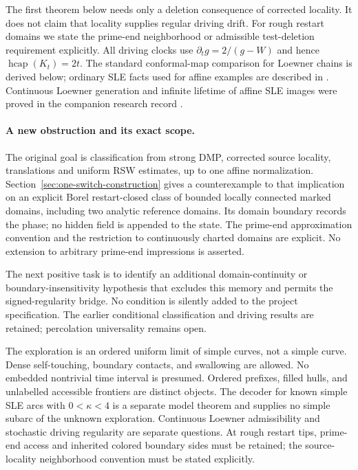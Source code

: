 \documentclass[11pt]{article}
\theoremstyle{definition}\newtheorem{definition}[theorem]{Definition}
\theoremstyle{remark}\newtheorem{remark}[theorem]{Remark}
\begin{document}
The first theorem below needs only a deletion consequence of corrected
locality. It does not claim that locality supplies regular driving drift.
For rough restart domains we state the prime-end neighborhood or admissible
test-deletion requirement explicitly. All driving clocks use
$\partial_tg=2/(g-W)$ and hence $\operatorname{hcap}(K_t)=2t$.
The standard conformal-map comparison for Loewner chains is derived below;
ordinary SLE facts used for affine examples are described in \cite{lawler,yuan}.
Continuous Loewner generation and infinite lifetime of affine SLE images
were proved in the companion research record \cite{record}.
\paragraph{A new obstruction and its exact scope.}
The original goal is classification from strong DMP, corrected source
locality, translations and uniform RSW estimates, up to one affine
normalization. Section~\ref{sec:one-switch-construction} gives a
counterexample to that implication on an explicit Borel restart-closed
class of bounded locally connected marked domains, including two
analytic reference domains. Its domain boundary records the phase;
no hidden field is appended to the state. The prime-end approximation
convention and the restriction to continuously charted domains are
explicit. No extension to arbitrary prime-end impressions is asserted.

The next positive task is to identify an additional domain-continuity
or boundary-insensitivity hypothesis that excludes this memory and
permits the signed-regularity bridge. No condition is silently added
to the project specification. The earlier conditional classification
and driving results are retained; percolation universality remains open.

The exploration is an ordered uniform limit of simple curves, not a
simple curve. Dense self-touching, boundary contacts, and swallowing are
allowed. No embedded nontrivial time interval is presumed. Ordered
prefixes, filled hulls, and unlabelled accessible frontiers are distinct
objects. The decoder for known simple SLE arcs with $0<\kappa<4$ is a
separate model theorem and supplies no simple subarc of the unknown
exploration. Continuous Loewner admissibility and stochastic driving
regularity are separate questions. At rough restart tips, prime-end
access and inherited colored boundary sides must be retained; the
source-locality neighborhood convention must be stated explicitly.
\end{document}

